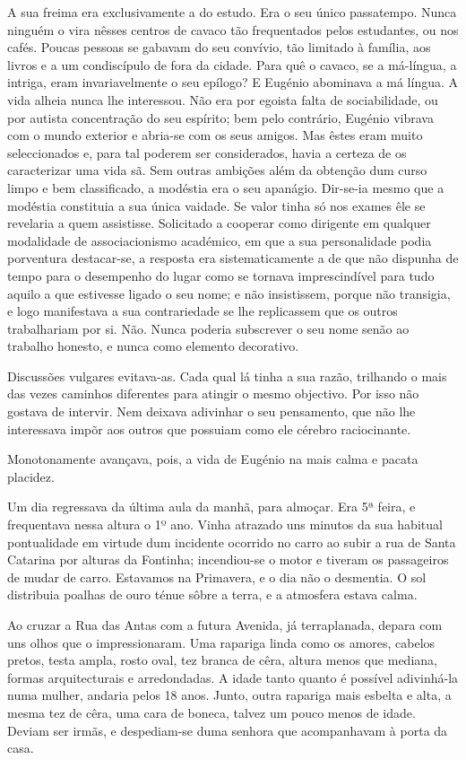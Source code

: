\documentclass[9pt]{article}
\begin{document}
A sua freima era exclusivamente a do estudo. Era o seu único passatempo. Nunca nin\-guém o vira nêsses centros de cavaco tão frequentados pelos estudantes, ou nos cafés. Poucas pessoas se gabavam do seu
con\-ví\-vio, tão limitado à fa\-mí\-lia, aos livros e a um condiscípulo de fora da cidade. Para quê o cavaco, se a má-língua, a intriga, eram invariavelmente o seu epílogo? E Eugé\-nio abominava a má língua. A vida a\-lheia
nunca lhe interessou. Não era por egoista falta de sociabilidade, ou
por autista concentra\-ção do seu espírito; bem pelo contrário, Eugé\-nio
vibrava com o mundo exterior e abria-se com os seus amigos. Mas êstes
eram muito seleccionados e, para tal poderem ser considerados, havia a
certeza de os ca\-ra\-cte\-ri\-zar uma vida sã. Sem outras ambi\-ções além da
obten\-ção dum curso limpo e bem classifi\-cado, a modéstia era o seu apanágio.
Dir-se-ia mesmo que a modéstia constituia a sua única vaidade. Se valor
tinha só nos exames êle se revelaria a quem assistisse. Solicitado
a cooperar como dirigente em qualquer modalidade de associacionismo académico, em
que a sua personalidade podia porventura destacar-se, a resposta era sistematicamente a de que não dispunha de tempo para o desempenho do lugar como se tornava imprescindível para
tudo aquilo a que estivesse ligado o seu nome; e não insistissem, porque
não transigia, e logo manifestava a sua contrariedade se lhe replicassem que os outros traba\-lhariam por si. Não. Nunca poderia subscrever
o seu nome senão ao traba\-lho honesto, e nunca como elemento decorativo.

Discussões vulgares evitava-as. Cada qual lá tinha a sua razão,
tri\-lhando o mais das vezes caminhos diferentes para atingir o
mesmo objectivo. Por isso não gostava de intervir. Nem deixava adivinhar o seu pensamento, que não lhe interessava impõr aos outros que possuiam como
ele cérebro raciocinante.

Monotonamente avan\-çava, pois, a vida de Eugé\-nio na mais calma e
pacata placidez.

Um dia regressava da última aula da manhã, para almoçar. Era 5ª feira, e frequentava nessa altura o 1º ano.
Vinha atrazado uns minu\-tos da sua habitual pontualidade em virtude dum
incidente ocorrido no carro ao subir a rua de Santa Catarina por alturas da Fontinha; incendi\-ou-se o motor e tiveram os passageiros de mudar de carro. Estavamos na Primavera, e o dia não o desmentia. O sol
distribuia poa\-lhas de ouro ténue sôbre a terra, e a atmosfera estava
calma.

Ao cruzar a Rua das Antas com a futura Avenida, já terraplanada,
depara com uns o\-lhos que o impressionaram. Uma rapariga linda como
os amores, cabelos pretos, testa ampla, rosto oval, tez branca de cêra, altura menos
que mediana, formas arquitecturais e arredondadas. A idade tanto quanto é possível adivinhá-la numa mu\-lher,
andaria pelos 18 anos. Junto, outra rapariga mais esbelta e alta, a mesma tez de cêra, uma cara de boneca, talvez um pouco menos de idade. Deviam ser irmãs, e despediam-se duma senhora que acompanhavam à porta
da casa.
\end{document}
